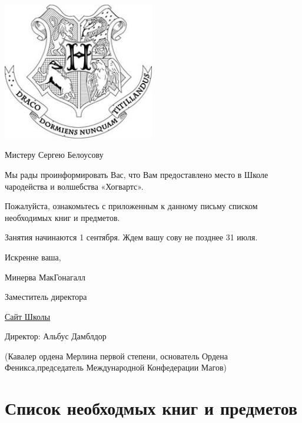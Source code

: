 \documentclass[14pt,a4paper, oneside]{extreport}
\begin{document}

\begin{center}
\includegraphics[height=6cm]{hg.jpg}
\end{center}

\vspace{1cm}

{\fontsize{12}{1}\selectfont Мистеру Сергею Белоусову}

\vspace{2.5cm}
Мы рады проинформировать Вас, что Вам предоставлено место в Школе чародейства и волшебства «Хогвартс».

Пожалуйста, ознакомьтесь с приложенным к данному письму списком необходимых книг и предметов.

Занятия начинаются 1 сентября. Ждем вашу сову не позднее 31 июля.

Искренне ваша,

{\Large{}}

Минерва МакГонагалл

Заместитель директора

\vfill
\begin{center}
{\fontsize{12}{1}\selectfont \href{http://www.hogwartsishere.com/}{Сайт Школы}}

{\footnotesize Директор: Альбус Дамблдор

(Кавалер ордена Мерлина первой степени, основатель Ордена Феникса,председатель Международной Конфедерации Магов)}
\end{center}


\newpage
\newpage
\appendix
\renewcommand{\thesection}{\appendixname~\Asbuk{section}}

\section{Список необходмых книг и предметов}
\end{document}
